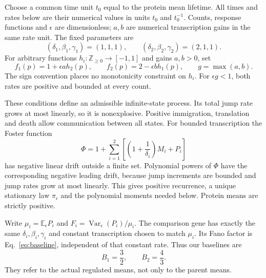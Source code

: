 \documentclass[11pt]{article}
\newcommand{\E}{\mathbb E}
\newcommand{\Var}{\operatorname{Var}}
\newcommand{\N}{\mathbb Z_{\geq0}}
\begin{document}
Choose a common time unit $t_0$ equal to the protein mean lifetime.
All times and rates below are their numerical values in units $t_0$
and $t_0^{-1}$. Counts, response functions and $\epsilon$ are dimensionless;
$a,b$ are numerical transcription gains in the same rate unit.
The fixed parameters are
\begin{equation}
 (\delta_1,\beta_1,\gamma_1)=(1,1,1),\qquad
 (\delta_2,\beta_2,\gamma_2)=(2,1,1).
 \label{eq:kinetics}
\end{equation}
For arbitrary functions $h_i:\N\to[-1,1]$ and gains $a,b>0$, set
\begin{equation}
 f_1(p)=1+\epsilon a h_2(p),\qquad
 f_2(p)=2-\epsilon b h_1(p),\qquad g=\max(a,b).
 \label{eq:feedback}
\end{equation}
The sign convention places no monotonicity constraint on $h_i$.
For $\epsilon g<1$, both rates are positive and bounded at every count.

These conditions define an admissible infinite-state process. Its total
jump rate grows at most linearly, so it is nonexplosive. Positive
immigration, translation and death allow communication between all
states. For bounded transcription the Foster function
\begin{equation}
 \Phi=1+\sum_{i=1}^2\left[\left(1+\frac{1}{\delta_i}\right)M_i+P_i\right]
\end{equation}
has negative linear drift outside a finite set. Polynomial powers of
$\Phi$ have the corresponding negative leading drift, because jump
increments are bounded and jump rates grow at most linearly. This gives
positive recurrence, a unique stationary law $\pi_\epsilon$ and the
polynomial moments needed below. Protein means are strictly positive.

Write $\mu_i=\E_\epsilon P_i$ and
$F_i=\Var_\epsilon(P_i)/\mu_i$. The comparison gene has exactly the same
$\delta_i,\beta_i,\gamma_i$ and constant transcription chosen to match
$\mu_i$. Its Fano factor is Eq.~\eqref{eq:baseline}, independent of that
constant rate. Thus our baselines are
\begin{equation}
 B_1=\frac32,\qquad B_2=\frac43.
 \label{eq:fixedbaselines}
\end{equation}
They refer to the actual regulated means, not only to the parent means.
\end{document}
